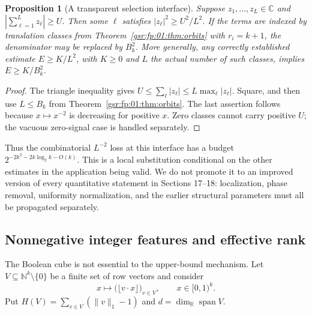 \documentclass[11pt,letterpaper]{article}
\numberwithin{equation}{section}
\newtheorem{proposition}[theorem]{Proposition}
\theoremstyle{definition}
\theoremstyle{remark}
\newcommand{\R}{\mathbb R}
\newcommand{\N}{\mathbb N}
\newcommand{\C}{\mathbb C}
\newcommand{\1}{\mathbf 1}
\begin{document}
\begin{proposition}[A transparent selection interface]\label{gsr:fp:01:prop:selection}
Suppose $z_1,\ldots,z_L\in\C$ and
$|\sum_{\ell=1}^Lz_\ell|\ge U$. Then some $\ell$ satisfies
$|z_\ell|^2\ge U^2/L^2$. If the terms are indexed by translation classes
from Theorem~\ref{gsr:fp:01:thm:orbits} with $r_i=k+1$, the denominator may be
replaced by $B_k^2$.
More generally, any correctly established estimate $E\ge K/L^2$,
with $K\ge0$ and $L$ the actual number of such classes, implies
$E\ge K/B_k^2$.
\end{proposition}
\begin{proof}
The triangle inequality gives
$U\le\sum_\ell|z_\ell|\le L\max_\ell|z_\ell|$.
Square, and then use $L\le B_k$ from Theorem~\ref{gsr:fp:01:thm:orbits}.
The last assertion follows because $x\mapsto x^{-2}$ is decreasing
for positive $x$. Zero classes cannot carry positive $U$; the vacuous
zero-signal case is handled separately.
\end{proof}

Thus the combinatorial $L^{-2}$ loss at this interface has a budget
$2^{-2k^2-2k\log_2k-O(k)}$. This is a local substitution conditional on
the other estimates in the application being valid. We do not promote it
to an improved version of every quantitative statement in Sections 17--18:
localization, phase removal, uniformity normalization, and the earlier
structural parameters must all be propagated separately.

\subsection{Nonnegative integer features and effective rank}
The Boolean cube is not essential to the upper-bound mechanism.
Let $V\subseteq\N^k\setminus\{0\}$ be a finite set of row vectors and
consider
\[
 x\longmapsto\bigl(\lfloor v\cdot x\rfloor\bigr)_{v\in V},
 \qquad x\in[0,1)^k.
\]
Put $H(V)=\sum_{v\in V}(\|v\|_1-1)$ and
$d=\dim_\R\operatorname{span}V$.
\end{document}
